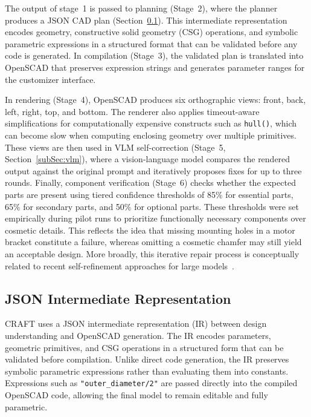 \documentclass[conference]{IEEEtran}
\begin{document}
The output of stage~1 is passed to planning (Stage~2), where the planner produces a JSON CAD plan (Section~\ref{subSec:json-ir}). This intermediate representation encodes geometry, constructive solid geometry (CSG) operations, and symbolic parametric expressions in a structured format that can be validated before any code is generated. In compilation (Stage~3), the validated plan is translated into OpenSCAD that preserves expression strings and generates parameter ranges for the customizer interface.

In rendering (Stage~4), OpenSCAD produces six orthographic views: front, back, left, right, top, and bottom. The renderer also applies timeout-aware simplifications for computationally expensive constructs such as \texttt{hull()}, which can become slow when computing enclosing geometry over multiple primitives. These views are then used in VLM self-correction (Stage~5, Section~\ref{subSec:vlm}), where a vision-language model compares the rendered output against the original prompt and iteratively proposes fixes for up to three rounds. Finally, component verification (Stage~6) checks whether the expected parts are present using tiered confidence thresholds of 85\% for essential parts, 65\% for secondary parts, and 50\% for optional parts. These thresholds were set empirically during pilot runs to prioritize functionally necessary components over cosmetic details. This reflects the idea that missing mounting holes in a motor bracket constitute a failure, whereas omitting a cosmetic chamfer may still yield an acceptable design. More broadly, this iterative repair process is conceptually related to recent self-refinement approaches for large models~\citep{madaan2023selfrefine}.

\subsection{JSON Intermediate Representation}
\label{subSec:json-ir}

CRAFT uses a JSON intermediate representation (IR) between design understanding and OpenSCAD generation. The IR encodes parameters, geometric primitives, and CSG operations in a structured form that can be validated before compilation. Unlike direct code generation, the IR preserves symbolic parametric expressions rather than evaluating them into constants. Expressions such as \texttt{"outer\_diameter/2"} are passed directly into the compiled OpenSCAD code, allowing the final model to remain editable and fully parametric.
\end{document}

